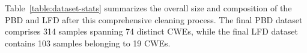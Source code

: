 \documentclass[lettersize,journal]{IEEEtran}
\begin{document}
Table~\ref{table:dataset-stats} summarizes the overall size and composition of the \gls{PBD} and \gls{LFD} after this comprehensive cleaning process. The final \gls{PBD} dataset comprises 314 samples spanning 74 distinct CWEs, while the final \gls{LFD} dataset contains 103 samples belonging to 19 CWEs.


\end{document}
